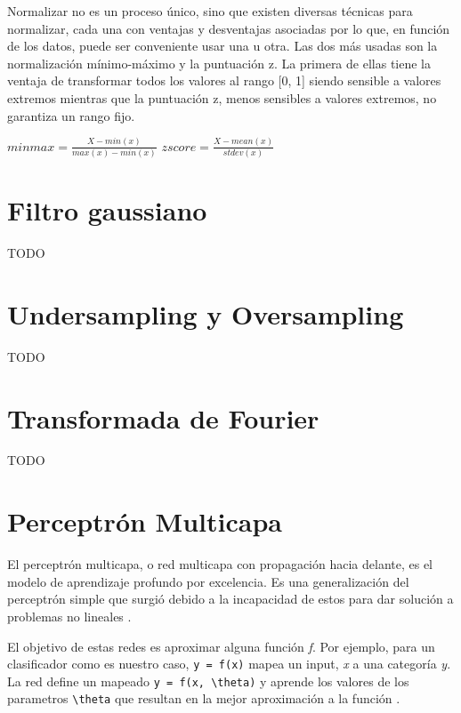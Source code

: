Normalizar no es un proceso único, sino que existen diversas técnicas para normalizar, cada una con ventajas y desventajas asociadas por lo que, en función de los datos, puede ser conveniente usar una u otra. Las dos más usadas son la normalización mínimo-máximo y la puntuación z. La primera de ellas tiene la ventaja de transformar todos los valores al rango [0, 1] siendo sensible a valores extremos mientras que la puntuación z, menos sensibles a valores extremos, no garantiza un rango fijo.

\begin{math}
	minmax = \frac{X - min(x)}{max(x) - min(x)}
\end{math}
\begin{math}	
	zscore = \frac{X - mean(x)}{stdev(x)}
\end{math}

\section{Filtro gaussiano}
TODO

\section{Undersampling y Oversampling}
TODO

\section{Transformada de Fourier}
TODO

\section{Perceptrón Multicapa}\label{sec:perceptron-multicapa}

El perceptrón multicapa, o red multicapa con propagación hacia delante,
es el modelo de aprendizaje profundo por excelencia. Es una
generalización del perceptrón simple que surgió debido a la incapacidad
de estos para dar solución a problemas no lineales \cite{Minsky-1969}.

El objetivo de estas redes es aproximar alguna función \emph{f}. Por
ejemplo, para un clasificador como es nuestro caso,
\texttt{y = f(x)} mapea un input, \emph{x} a una categoría \emph{y}.
La red define un mapeado \texttt{y = f(x, \textbackslash{}theta)} y
aprende los valores de los parametros \texttt{\textbackslash{}theta}
que resultan en la mejor aproximación a la función \cite{Goodfellow-et-al-2016}.

